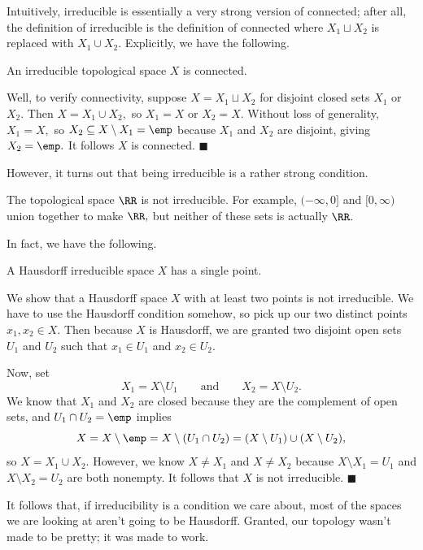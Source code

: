 Intuitively, irreducible is essentially a very strong version of connected; after all, the definition of irreducible is the definition of connected where $X_1\sqcup X_2$ is replaced with $X_1\cup X_2.$ Explicitly, we have the following.
\begin{proposition}
    An irreducible topological space $X$ is connected.
\end{proposition}
Well, to verify connectivity, suppose $X=X_1\sqcup X_2$ for disjoint closed sets $X_1$ or $X_2.$ Then $X=X_1\cup X_2,$ so $X_1=X$ or $X_2=X.$ Without loss of generality, $X_1=X,$ so $X_2\subseteq X\setminus X_1=\emp$ because $X_1$ and $X_2$ are disjoint, giving $X_2=\emp.$ It follows $X$ is connected. $\blacksquare$

However, it turns out that being irreducible is a rather strong condition.
\begin{example}
    The topological space $\RR$ is not irreducible. For example, $(-\infty,0]$ and $[0,\infty)$ union together to make $\RR,$ but neither of these sets is actually $\RR.$
\end{example}
In fact, we have the following.
\begin{proposition}
    A Hausdorff irreducible space $X$ has a single point.
\end{proposition}
We show that a Hausdorff space $X$ with at least two points is not irreducible. We have to use the Hausdorff condition somehow, so pick up our two distinct points $x_1,x_2\in X.$ Then because $X$ is Hausdorff, we are granted two disjoint open sets $U_1$ and $U_2$ such that $x_1\in U_1$ and $x_2\in U_2.$

Now, set
\[X_1=X\setminus U_1\qquad\text{and}\qquad X_2=X\setminus U_2.\]
We know that $X_1$ and $X_2$ are closed because they are the complement of open sets, and $U_1\cap U_2=\emp$ implies
\[X=X\setminus\emp=X\setminus(U_1\cap U_2)=(X\setminus U_1)\cup(X\setminus U_2),\]
so $X=X_1\cup X_2.$ However, we know $X\ne X_1$ and $X\ne X_2$ because $X\setminus X_1=U_1$ and $X\setminus X_2=U_2$ are both nonempty. It follows that $X$ is not irreducible. $\blacksquare$

It follows that, if irreducibility is a condition we care about, most of the spaces we are looking at aren't going to be Hausdorff. Granted, our topology wasn't made to be pretty; it was made to work.

